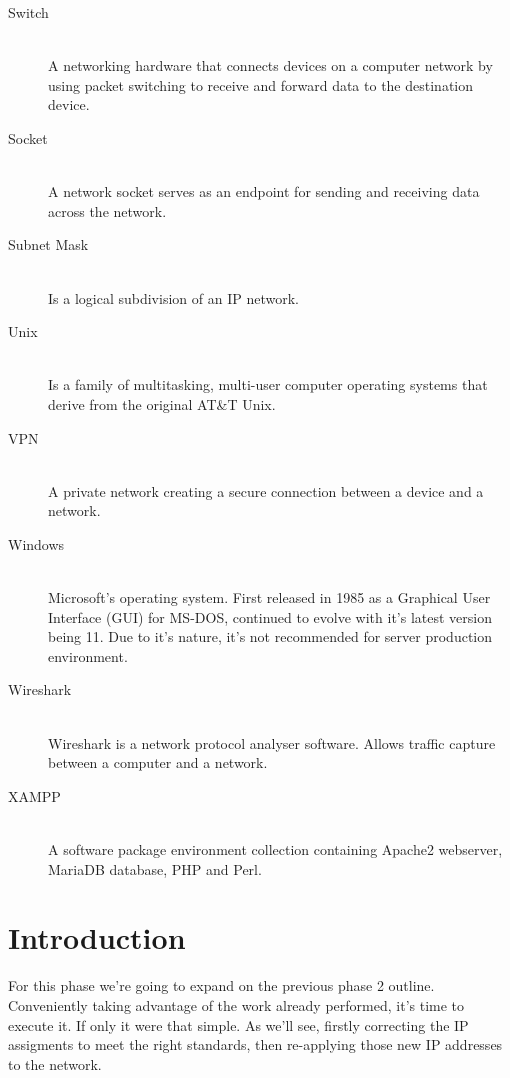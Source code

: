 \documentclass[11pt,a4paper]{report}
\begin{document}
\begin{description}
        \item[Switch] \hfill \\
            A networking hardware that connects devices on a computer network by using packet switching to receive and forward data to the destination device.
        \item[Socket] \hfill \\
            A network socket serves as an endpoint for sending and receiving data across the network.
        \item[Subnet Mask] \hfill \\
            Is a logical subdivision of an IP network.
        \item[Unix] \hfill \\
            Is a family of multitasking, multi-user computer operating systems that derive from the original AT\&T Unix.
        \item[VPN] \hfill \\
            A private network creating a secure connection between a device and a network.
        \item[Windows] \hfill \\
            Microsoft's operating system. First released in 1985 as a Graphical User Interface (GUI) for MS-DOS, continued to evolve with it's latest version being 11.
            Due to it's nature, it's not recommended for server production environment.
        \item[Wireshark] \hfill \\
            Wireshark is a network protocol analyser software. Allows traffic capture between a computer and a network.
        \item[XAMPP] \hfill \\
            A software package environment collection containing Apache2 webserver, MariaDB database, PHP and Perl.
    \end{description}

\chapter{Introduction}
    \pagestyle{fancy}
    For this phase we're going to expand on the previous phase 2 outline. \\
    Conveniently taking advantage of the work already performed, it's time to execute it. If only it were that simple.
    As we'll see, firstly correcting the IP assigments to meet the right standards, then re-applying those new IP addresses to the network.
\end{document}
